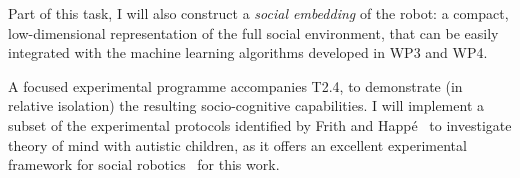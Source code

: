 Part of this task, I will also construct a \emph{social embedding} of the robot:
a compact, low-dimensional representation of the full social environment, that
can be easily integrated with the machine learning algorithms developed in WP3
and WP4.

A focused experimental programme accompanies T2.4, to demonstrate (in relative
isolation) the resulting socio-cognitive capabilities. I will implement a subset
of the experimental protocols identified by Frith and
Happé~\cite{frith1994autism} to investigate theory of mind with autistic
children, as it offers an excellent experimental framework for social
robotics~\cite{lemaignan2015mutual} for this work.

%
%
